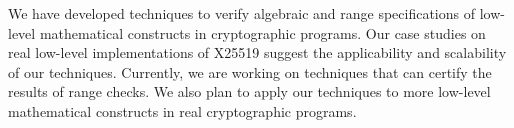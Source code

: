 
We have developed techniques to verify algebraic and range specifications of
low-level mathematical constructs in cryptographic programs. Our case
studies on real low-level implementations of X25519 suggest the
applicability and scalability of our techniques. Currently, we are
working on techniques that can certify the results of range checks. We also plan to
apply our techniques to more low-level mathematical constructs in real
cryptographic programs.
